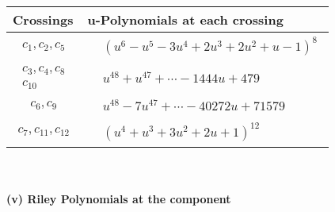 \documentclass[1p]{elsarticle_modified}
\theoremstyle{definition}
\begin{document}
\begin{tabular}{m{50pt}|m{274pt}}
Crossings & \hspace{64pt}u-Polynomials at each crossing \\
\hline $$\begin{aligned}c_{1},c_{2},c_{5}\end{aligned}$$&$\begin{aligned}
&(u^6- u^5-3 u^4+2 u^3+2 u^2+u-1)^8
\end{aligned}$\\
\hline $$\begin{aligned}c_{3},c_{4},c_{8}\\c_{10}\end{aligned}$$&$\begin{aligned}
&u^{48}+u^{47}+\cdots-1444 u+479
\end{aligned}$\\
\hline $$\begin{aligned}c_{6},c_{9}\end{aligned}$$&$\begin{aligned}
&u^{48}-7 u^{47}+\cdots-40272 u+71579
\end{aligned}$\\
\hline $$\begin{aligned}c_{7},c_{11},c_{12}\end{aligned}$$&$\begin{aligned}
&(u^4+u^3+3 u^2+2 u+1)^{12}
\end{aligned}$\\
\hline
\end{tabular}\\~\\
\newpage\renewcommand{\arraystretch}{1}
\flushleft \textbf{(v) Riley Polynomials at the component}\newline \\
\end{document}
